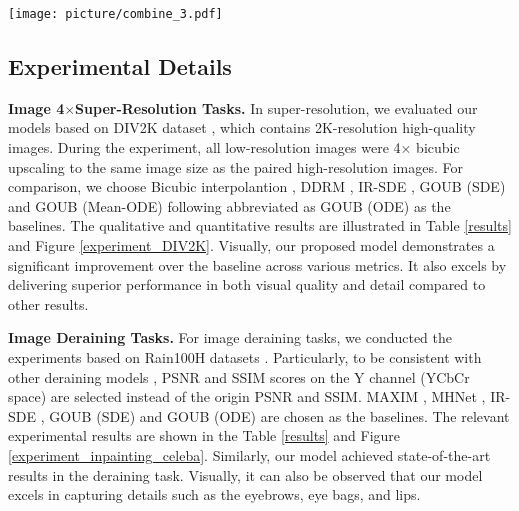 \begin{figure*}[t] %
    \centering
    \texttt{[image: picture/combine\_3.pdf]}
    \vspace{-8mm}
    \caption{Qualitative comparison of visual results between GOUB (SDE) and UniDB (SDE) on the Rain100H dataset on Image Deraining (Left) and CelebA-HQ dataset on Image Inpainting (Right)  with zoomed-in image local regions (UniDB based on GOU process).}
    \label{experiment_inpainting_celeba}
    \vspace{-3mm}
\end{figure*}  





\vspace{-2mm}






\subsection{Experimental Details}


\textbf{Image 4$\times$Super-Resolution Tasks.}
In super-resolution, we evaluated our models based on DIV2K dataset \cite{8014884}, which contains 2K-resolution high-quality images. During the experiment, all low-resolution images were 4$\times$ bicubic upscaling to the same image size as the paired high-resolution images. For comparison, we choose Bicubic interpolantion \cite{DDRM}, DDRM \cite{DDRM}, IR-SDE \cite{IRSDE}, GOUB (SDE) \cite{yue2024imagerestorationgeneralizedornsteinuhlenbeck} and GOUB (Mean-ODE) \cite{yue2024imagerestorationgeneralizedornsteinuhlenbeck} following abbreviated as GOUB (ODE) as the baselines. The qualitative and quantitative results are illustrated in Table \ref{results} and Figure \ref{experiment_DIV2K}. Visually, our proposed model demonstrates a significant improvement over the baseline across various metrics. It also excels by delivering superior performance in both visual quality and detail compared to other results.


\textbf{Image Deraining Tasks.}
For image deraining tasks, we conducted the experiments based on Rain100H datasets \cite{8099666}. Particularly, to be consistent with other deraining models \cite{ren2019progressiveimagederainingnetworks, zamir2021multistageprogressiveimagerestoration, IRSDE, yue2024imagerestorationgeneralizedornsteinuhlenbeck}, PSNR and SSIM scores on the Y channel (YCbCr space) are selected instead of the origin PSNR and SSIM. MAXIM \cite{MAXIM}, MHNet \cite{MHNet}, IR-SDE \cite{IRSDE}, GOUB (SDE) \cite{yue2024imagerestorationgeneralizedornsteinuhlenbeck} and GOUB (ODE) \cite{yue2024imagerestorationgeneralizedornsteinuhlenbeck} are chosen as the baselines. The relevant experimental results are shown in the Table \ref{results} and Figure \ref{experiment_inpainting_celeba}. Similarly, our model achieved state-of-the-art results in the deraining task. Visually, it can also be observed that our model excels in capturing details such as the eyebrows, eye bags, and lips.


